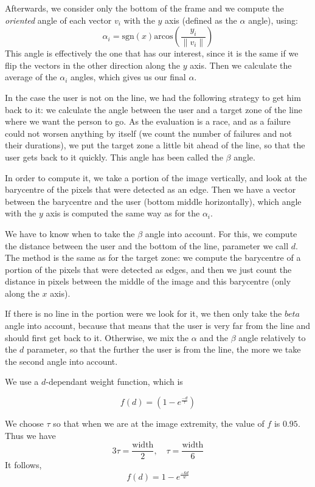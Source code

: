 \documentclass{rapport}
\begin{document}
Afterwards, we consider only the bottom of the frame and we compute the \textit{oriented} angle of each vector \(v_i\) with the \(y\) axis (defined as the \(\alpha\) angle), using:
\[ {\alpha}_i = \text{sgn}(x) \text{arcos}\left(\frac{y_i}{\|v_i\|}\right) \]
This angle is effectively the one that has our interest, since it is the same if we flip the vectors in the other direction along the \(y\) axis.
Then we calculate the average of the \(\alpha_i\) angles, which gives us our final \(\alpha\).

In the case the user is not on the line, we had the following strategy to get him back to it: we calculate the angle between the user and a target zone of the line where we want the person to go. As the evaluation is a race, and as a failure could not worsen anything by itself (we count the number of failures and not their durations), we put the target zone a little bit ahead of the line, so that the user gets back to it quickly. This angle has been called the \(\beta\) angle.

In order to compute it, we take a portion of the image vertically, and look at the barycentre of the pixels that were detected as an edge. Then we have a vector between the barycentre and the user (bottom middle horizontally), which angle with the \(y\) axis is computed the same way as for the \(\alpha_i\).

We have to know when to take the \(\beta\) angle into account. For this, we compute the distance between the user and the bottom of the line, parameter we call \(d\). The method is the same as for the target zone: we compute the barycentre of a portion of the pixels that were detected as edges, and then we just count the distance in pixels between the middle of the image and this barycentre (only along the \(x\) axis). 


If there is no line in the portion were we look for it, we then only take the \(beta\) angle into account, because that means that the user is very far from the line and should first get back to it. Otherwise, we mix the \(\alpha\) and the \(\beta\) angle relatively to the \(d\) parameter, so that the further the user is from the line, the more we take the second angle into account.

We use a \(d\)-dependant weight function, which is

\[ f(d) = (1 - e^{\frac{-d}{\tau}}) \]

We choose \(\tau\) so that when we are at the image extremity, the value of \(f\) is \(0.95\). Thus we have
\[ 3\tau = \frac{\text{width}}{2}, \quad \tau = \frac{\text{width}}{6} \]
It follows,
\[f(d) = 1 - e^{\frac{-6d}{w}}\]
\end{document}
